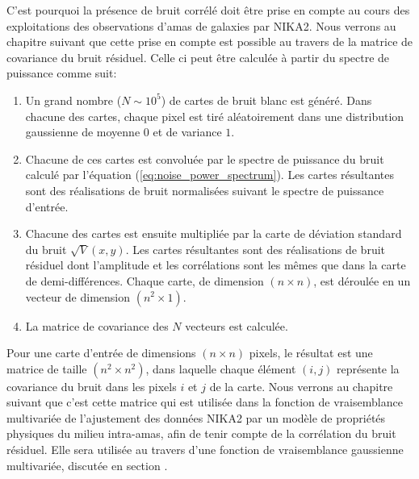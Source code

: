 C'est pourquoi la présence de bruit corrélé doit être prise en compte au cours des exploitations des observations d'amas de galaxies par NIKA2.
Nous verrons au chapitre suivant que cette prise en compte est possible au travers de la matrice de covariance du bruit résiduel.
Celle ci peut être calculée à partir du spectre de puissance comme suit:
\begin{enumerate}[leftmargin=*]
    \item Un grand nombre ($N \sim 10^5$) de cartes de bruit blanc est généré.
        Dans chacune des cartes, chaque pixel est tiré aléatoirement dans une distribution gaussienne de moyenne $0$ et de variance $1$.
    \item Chacune de ces cartes est convoluée par le spectre de puissance du bruit calculé par l'équation (\ref{eq:noise_power_spectrum}).
        Les cartes résultantes sont des réalisations de bruit normalisées suivant le spectre de puissance d'entrée.
    \item Chacune des cartes est ensuite multipliée par la carte de déviation standard du bruit $\sqrt{V}(x, y)$.
        Les cartes résultantes sont des réalisations de bruit résiduel dont l'amplitude et les corrélations sont les mêmes que dans la carte de demi-différences.
        Chaque carte, de dimension $(n \times n)$, est déroulée en un vecteur de dimension $(n^2 \times 1)$.
    \item La matrice de covariance des $N$ vecteurs est calculée.
\end{enumerate}
Pour une carte d'entrée de dimensions $(n \times n)$ pixels, le résultat est une matrice de taille $(n^2 \times n^2)$, dans laquelle chaque élément $(i, j)$ représente la covariance du bruit dans les pixels $i$ et $j$ de la carte.
Nous verrons au chapitre suivant que c'est cette matrice qui est utilisée dans la fonction de vraisemblance multivariée de l'ajustement des données NIKA2 par un modèle de propriétés physiques du milieu intra-amas, afin de tenir compte de la corrélation du bruit résiduel.
Elle sera utilisée au travers d'une fonction de vraisemblance gaussienne multivariée, discutée en section .


